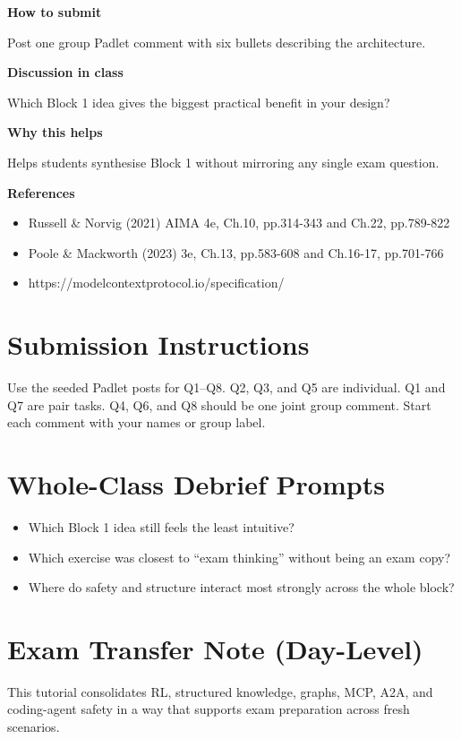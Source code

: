 \documentclass[11pt]{article}
\providecommand{\tightlist}{\setlength{\itemsep}{0pt}\setlength{\parskip}{0pt}}
\begin{document}
\begin{tcolorbox}[colback=white,colframe=MidnightBlue,title={Q8 Stretch Synthesis},fonttitle=\bfseries,breakable]
{\large\bfseries\color{MidnightBlue} How to submit}\par\medskip
Post one group Padlet comment with six bullets describing the architecture.

{\large\bfseries\color{MidnightBlue} Discussion in class}\par\medskip
Which Block 1 idea gives the biggest practical benefit in your design?

{\large\bfseries\color{MidnightBlue} Why this helps}\par\medskip
Helps students synthesise Block 1 without mirroring any single exam question.

{\large\bfseries\color{MidnightBlue} References}\par\medskip
\begin{itemize}\item Russell \& Norvig (2021) AIMA 4e, Ch.10, pp.314-343 and Ch.22, pp.789-822
\item Poole \& Mackworth (2023) 3e, Ch.13, pp.583-608 and Ch.16-17, pp.701-766
\item https://modelcontextprotocol.io/specification/\end{itemize}
\end{tcolorbox}

\section*{Submission Instructions}

Use the seeded Padlet posts for Q1--Q8. Q2, Q3, and Q5 are individual. Q1 and Q7 are pair tasks. Q4, Q6, and Q8 should be one joint group comment. Start each comment with your names or group label.

\section*{Whole-Class Debrief Prompts}

\begin{itemize}
\tightlist
\item
  Which Block 1 idea still feels the least intuitive?
\item
  Which exercise was closest to ``exam thinking'' without being an exam copy?
\item
  Where do safety and structure interact most strongly across the whole block?
\end{itemize}

\section*{Exam Transfer Note (Day-Level)}

This tutorial consolidates RL, structured knowledge, graphs, MCP, A2A, and coding-agent safety in a way that supports exam preparation across fresh scenarios.
\end{document}
